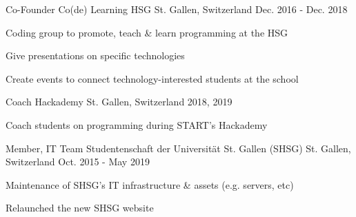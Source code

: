 

\begin{cventries}

  \cventry
    {Co-Founder} %
    {Co(de) Learning HSG} %
    {St. Gallen, Switzerland} %
    {Dec. 2016 - Dec. 2018} %
    {} %
    {
      \begin{cvitems} %
        \item {Coding group to promote, teach \& learn programming at the HSG}
        \item {Give presentations on specific technologies}
        \item {Create events to connect technology-interested students at the school}
      \end{cvitems}
    }

    \cventry
      {Coach} %
      {Hackademy} %
      {St. Gallen, Switzerland} %
      {2018, 2019} %
      {} %
      {
        \begin{cvitems} %
          \item {Coach students on programming during START's Hackademy}
        \end{cvitems}
      }

  \cventry
    {Member, IT Team} %
    {Studentenschaft der Universität St. Gallen (SHSG)} %
    {St. Gallen, Switzerland} %
    {Oct. 2015 - May 2019} %
    {} %
    {
      \begin{cvitems} %
        \item {Maintenance of SHSG's IT infrastructure \& assets (e.g. servers, etc)}
        \item {Relaunched the new SHSG website}
      \end{cvitems}
    }


\end{cventries}
